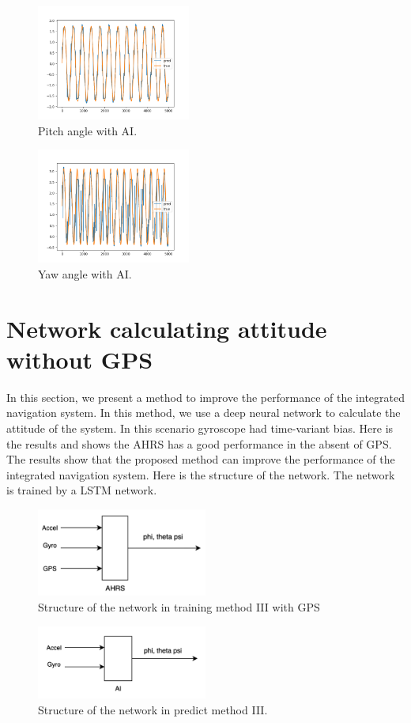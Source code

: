 \documentclass[conference]{IEEEtran}
\begin{document}
    \begin{figure}[H]
        \centerline{\includegraphics[width=0.45\textwidth]{../Figures/part_3_theta.png}}
        \caption{Pitch angle with AI.}
    \end{figure}
    \begin{figure}[H]
        \centerline{\includegraphics[width=0.45\textwidth]{../Figures/part_3_psi.png}}
        \caption{Yaw angle with AI.}
    \end{figure}

    \section{Network calculating attitude without GPS}
    In this section, we present a method to improve the performance of the integrated navigation system. In this method, we use a deep neural network to calculate the attitude of the system. In this scenario gyroscope had time-variant bias. Here is the results and shows the AHRS has a good performance in the absent of GPS. The results show that the proposed method can improve the performance of the integrated navigation system. Here is the structure of the network. The network is trained by a LSTM network.


    \begin{figure}[H]
        \centerline{\includegraphics[width=0.5\textwidth]{../Figures/part_3_network_train_GPS.png}}
        \caption{Structure of the network in training method III with GPS}
    \end{figure}

    \begin{figure}[H]
        \centerline{\includegraphics[width=0.5\textwidth]{../Figures/part_3_network_predict.png}}
        \caption{Structure of the network in predict method III.}
    \end{figure}
\end{document}
